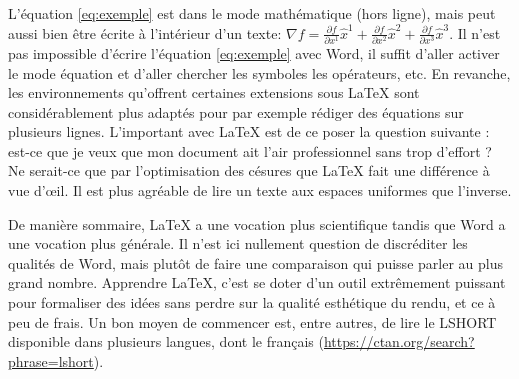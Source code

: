 	L'équation \ref{eq:exemple} est dans le mode mathématique (hors ligne), mais peut aussi bien être écrite à l'intérieur d'un texte:
	\(
	\nabla f =%
	\frac{\partial f}{\partial x^1}\widehat{x}^1%
	+\frac{\partial f}{\partial x^2}\widehat{x}^2%
	+\frac{\partial f}{\partial x^3}\widehat{x}^3
	\).
	Il n'est pas impossible d'écrire l'équation \ref{eq:exemple} avec Word, il suffit d'aller activer le mode équation et d'aller chercher les symboles les opérateurs, etc. En revanche, les environnements qu'offrent certaines extensions sous \LaTeX{} sont considérablement plus adaptés pour par exemple rédiger des équations sur plusieurs lignes. L'important avec \LaTeX{} est de ce poser la question suivante : est-ce que je veux que mon document ait l'air professionnel sans trop d'effort ? Ne serait-ce que par l'optimisation des césures que \LaTeX{} fait une différence à vue d'\oe il. Il est plus agréable de lire un texte aux espaces uniformes que l'inverse.
	\par De manière sommaire, \LaTeX{} a une vocation plus scientifique tandis que Word a une vocation plus générale. Il n'est ici nullement question de discréditer les qualités de Word, mais plutôt de faire une comparaison qui puisse parler au plus grand nombre. Apprendre \LaTeX, c'est se doter d'un outil extrêmement puissant pour formaliser des idées sans perdre sur la qualité esthétique du rendu, et ce à peu de frais. Un bon moyen de commencer est, entre autres, de lire le LSHORT disponible dans plusieurs langues, dont le français (\url{https://ctan.org/search?phrase=lshort}).
	

